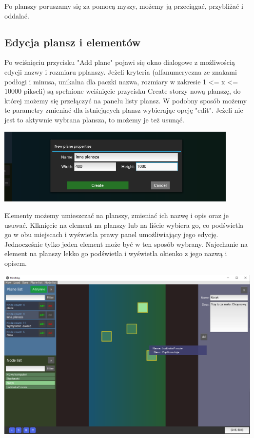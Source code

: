 \documentclass[a4paper,11pt]{article}
\begin{document}
Po planszy poruszamy się za pomocą myszy, możemy ją przeciągać, przybliżać i oddalać.

\subsection{Edycja plansz i elementów}
Po wciśnięciu przycisku "Add plane" pojawi się okno dialogowe z możliwością edycji nazwy i rozmiaru pplanszy. Jeżeli kryteria (alfanumeryczna ze znakami podłogi i minusa, unikalna dla paczki nazwa, rozmiary w zakresie 1 <= x <= 10000 pikseli) są spełnione wciśnięcie przycisku Create storzy nową planszę, do której możemy się przełączyć na panelu listy plansz. W podobny sposób możemy te parametry zmieniać dla istniejących plansz wybierając opcję "edit". Jeżeli nie jest to aktywnie wybrana plansza, to możemy je też usunąć.

\begin{center}
    \includegraphics[width=12cm]{img/createpopup.png}
\end{center}

Elementy możemy umieszczać na planszy, zmieniać ich nazwę i opis oraz je usuwać. Klknięcie na element na planszy lub na liście wybiera go, co podświetla go w obu miejscach i wyświetla prawy panel umożliwiający jego edycję. Jednocześnie tylko jeden element może być w ten sposób wybrany. Najechanie na element na planszy lekko go podświetla i wyświetla okienko z jego nazwą i opisem.

\begin{center}
    \includegraphics[width=16cm]{img/screen_with_things.png}
\end{center}
\end{document}

